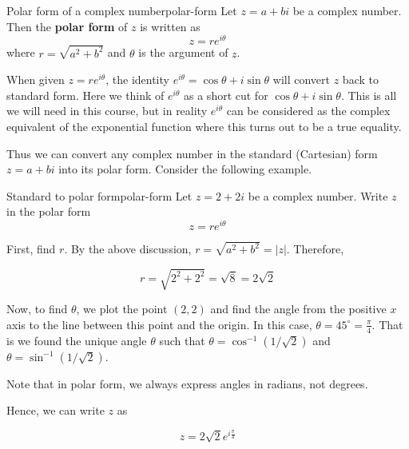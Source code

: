 \begin{definition}{Polar form of a complex number}{polar-form}
Let $z = a + bi$ be a complex number. Then the \textbf{polar form} of $z$ is written as
\[
z = re^{i\theta}
\]
where $r = \sqrt{a^2 + b^2}$ and $\theta$ is the argument of $z$.
\end{definition}

When given $z = re^{i\theta}$, the identity $e^{i\theta} = \cos\theta + i \sin\theta$ will convert $z$ back to standard form. Here we think of $ e^{i \theta}$ as a short cut for $ \cos \theta
+i\sin \theta$. This is all we will need in this course, but in
reality $e^{i \theta}$ can be considered as the complex equivalent of
the exponential function where this turns out to be a true equality.

\begin{center}
\end{center}

Thus we can convert any complex number in the standard (Cartesian) form $z = a+bi$
into its polar form. Consider the following example.

\begin{example}{Standard to polar form}{polar-form}
Let $z = 2 + 2i$ be a complex number.
Write $z$ in the polar form
\begin{equation*}
z = re^{i \theta}
\end{equation*}
\end{example}

\begin{solution}
First, find $r$.
By the above discussion, $r=\sqrt{
a^{2}+b^{2}} = |z|$. Therefore,

\begin{equation*}
r = \sqrt{2^{2} + 2^{2}} = \sqrt{8} =2\sqrt{2}
\end{equation*}

Now, to find $\theta$, we plot the point $(2, 2)$ and
find the angle from the positive $x$ axis to the line between this
point and the origin. In this case, $\theta = 45^{\circ} =
\frac{\pi}{4}$.  That is we found the unique angle $\theta$ such that
$\theta = \cos^{-1}(1/\sqrt{2})$ and $\theta = \sin^{-1}(1/\sqrt{2})$.

Note that in polar form, we always express angles in radians, not degrees.

Hence, we can write $z$ as

\begin{equation*}
z = 2\sqrt{2} e^{i\frac{\pi}{4}}
\end{equation*}

\end{solution}

